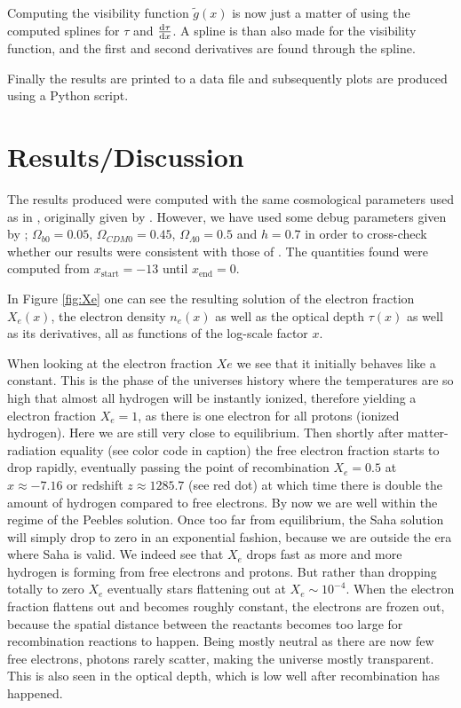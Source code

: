 \documentclass[twocolumn]{aastex62}
\begin{document}
Computing the visibility function $\tilde{g}(x)$ is now just a matter of using the computed splines for $\tau$ and $\dv{\tau}{x}$. A spline is than also made for the visibility function, and the first and second derivatives are found through the spline. 

Finally the results are printed to a data file and subsequently plots are produced using a Python script.

\section{Results/Discussion}\label{sec:Results}
The results produced were computed with the same cosmological parameters used as in \cite{stutzer:2020}, originally given by \cite{callin:2006}. However, we have used some debug parameters given by \cite{winther:2020}; $\Omega_{b0} = 0.05$, $\Omega_{CDM0} = 0.45$, $\Omega_{\Lambda 0} = 0.5$ and $h = 0.7$ in order to cross-check whether our results were consistent with those of \cite{winther:2020}. The quantities found were computed from $x_\text{start} = -13$ until $x_\text{end} = 0$.

In Figure \ref{fig:Xe} one can see the resulting solution of the electron fraction $X_e(x)$, the electron density $n_e(x)$ as well as the optical depth $\tau(x)$ as well as its derivatives, all as functions of the log-scale factor $x$. 

When looking at the electron fraction $Xe$ we see that it initially behaves like a constant. This is the phase of the universes history where the temperatures are so high that almost all hydrogen will be instantly ionized, therefore yielding a electron fraction $X_e = 1$, as there is one electron for all protons (ionized hydrogen). Here we are still very close to equilibrium. Then shortly after matter-radiation equality (see color code in caption) the free electron fraction starts to drop rapidly, eventually passing the point of recombination $X_e = 0.5$ at $x \approx -7.16$ or redshift $z \approx 1285.7$ (see red dot) at which time there is double the amount of hydrogen compared to free electrons. By now we are well within the regime of the Peebles solution. Once too far from equilibrium, the Saha solution will simply drop to zero in an exponential fashion, because we are outside the era where Saha is valid. We indeed see that $X_e$ drops fast as more and more hydrogen is forming from free electrons and protons. But rather than dropping totally to zero $X_e$ eventually stars flattening out at $X_e \sim 10^{-4}$. When the electron fraction flattens out and becomes roughly constant, the electrons are frozen out, because the spatial distance between the reactants becomes too large for recombination reactions to happen. Being mostly neutral as there are now few free electrons, photons rarely scatter, making the universe mostly transparent. This is also seen in the optical depth, which is low well after recombination has happened.
\end{document}
